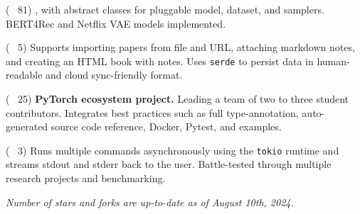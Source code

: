 
\begin{cvlist}

  \cvlistitem
    {\href{https://github.com/jaywonchung/BERT4Rec-VAE-Pytorch}{} 
    {\normalfont( \faCodeFork~81)}} %
    {, with abstract classes for pluggable model, dataset, and samplers. BERT4Rec and Netflix VAE models implemented.} %

  \cvlistitem
    {\href{https://github.com/jaywonchung/reason}{}
    {\normalfont( \faCodeFork~5)}} %
    { Supports importing papers from file and URL, attaching markdown notes, and creating an HTML book with notes. Uses \texttt{serde} to persist data in human-readable and cloud sync-friendly format.} %

  \cvlistitem
    {\href{https://github.com/SymbioticLab/Zeus}{}
    {\normalfont( \faCodeFork~25)}} %
    { \textbf{PyTorch ecosystem project.} Leading a team of two to three student contributors. Integrates best practices such as full type-annotation, auto-generated source code reference, Docker, Pytest, and examples.} %

  \cvlistitem
    {\href{https://github.com/jaywonchung/pegasus}{}
    {\normalfont( \faCodeFork~3)}} %
    { Runs multiple commands asynchronously using the \texttt{tokio} runtime and streams stdout and stderr back to the user. Battle-tested through multiple research projects and benchmarking.} %

\end{cvlist}

\vspace{-5mm}

\begin{cvparagraph}
\textit{Number of stars and forks are up-to-date as of August 10th, 2024.}
\end{cvparagraph}
